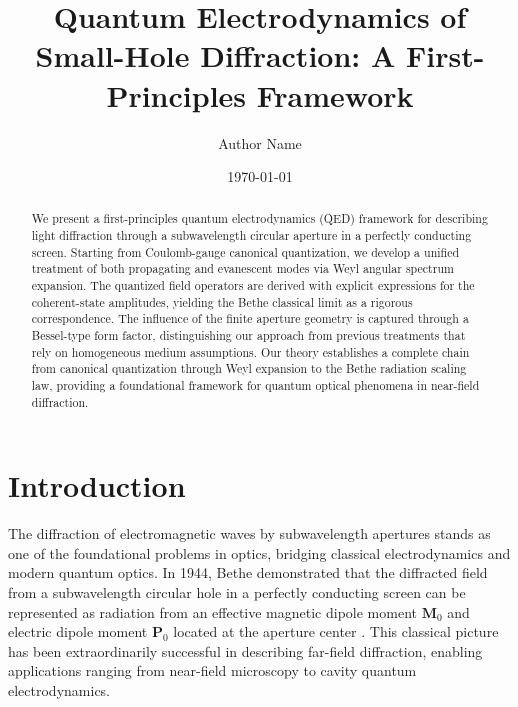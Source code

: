 \documentclass[%
 reprint,
 amsmath,amssymb,
 aps,
 floatfix,
]{revtex4-2}
\begin{document}

\title{Quantum Electrodynamics of Small-Hole Diffraction: A First-Principles Framework}

\author{Author Name}
%

\date{\today}%

\begin{abstract}
We present a first-principles quantum electrodynamics (QED) framework for describing light diffraction through a subwavelength circular aperture in a perfectly conducting screen. Starting from Coulomb-gauge canonical quantization, we develop a unified treatment of both propagating and evanescent modes via Weyl angular spectrum expansion. The quantized field operators are derived with explicit expressions for the coherent-state amplitudes, yielding the Bethe classical limit as a rigorous correspondence. The influence of the finite aperture geometry is captured through a Bessel-type form factor, distinguishing our approach from previous treatments that rely on homogeneous medium assumptions. Our theory establishes a complete chain from canonical quantization through Weyl expansion to the Bethe radiation scaling law, providing a foundational framework for quantum optical phenomena in near-field diffraction.
\end{abstract}


\maketitle

\section{Introduction}
The diffraction of electromagnetic waves by subwavelength apertures stands as one of the foundational problems in optics, bridging classical electrodynamics and modern quantum optics. In 1944, Bethe demonstrated that the diffracted field from a subwavelength circular hole in a perfectly conducting screen can be represented as radiation from an effective magnetic dipole moment $\mathbf{M}_0$ and electric dipole moment $\mathbf{P}_0$ located at the aperture center \cite{Bethe1944}. This classical picture has been extraordinarily successful in describing far-field diffraction, enabling applications ranging from near-field microscopy to cavity quantum electrodynamics.
\end{document}
